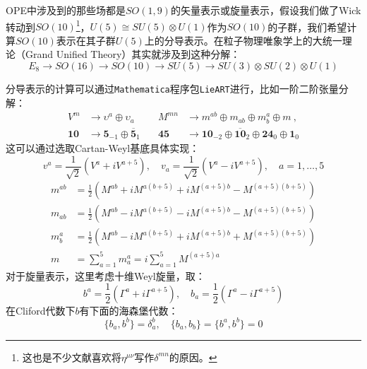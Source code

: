 OPE中涉及到的那些场都是$SO(1,9)$的矢量表示或旋量表示，假设我们做了Wick转动到$SO(10)$\footnote{这也是不少文献喜欢将$\eta^{\mu\nu}$写作$\delta^{mn}$的原因。}，$U(5)\cong SU(5)\otimes U(1)$作为$SO(10)$的子群，我们希望计算$SO(10)$表示在其子群$U(5)$上的分导表示。在粒子物理唯象学上的大统一理论（Grand Unified Theory）其实就涉及到这种分解：\cite{Georgi:2000vve,Zee:2016fuk}
\begin{equation}
	E_8\to SO(16)\to SO(10)\to SU(5)\to SU(3)\otimes SU(2)\otimes U(1)
\end{equation}

分导表示的计算可以通过\texttt{Mathematica}程序包\texttt{LieART}\cite{FEGER2020107490}进行，比如一阶二阶张量分解：
\begin{equation}
	\begin{aligned}
		V^{m}&\to\upsilon^{a}\oplus\upsilon_{a}\quad&M^{mn}&\to m^{ab}\oplus m_{ab}\oplus m_{b}^{a}\oplus m\mathrm{~,}\\
		\mathbf{10}&\to\mathbf{5}_{-1}\oplus\mathbf{\overline{5}}_{1}\quad&\mathbf{45}&\to\mathbf{10}_{-2}\oplus\mathbf{\overline{10}}_{2}\oplus\mathbf{24}_{0}\oplus\mathbf{1}_{0}
		\end{aligned}
\end{equation}
这可以通过选取Cartan-Weyl基底具体实现：\cite{Nekrasov:2005wg}
\begin{equation}
	v^a=\frac{1}{\sqrt{2}}\left(V^a+iV^{a+5}\right),\quad v_a=\frac{1}{\sqrt{2}}\left(V^a-iV^{a+5}\right),\quad a=1,\ldots,5
\end{equation}
\begin{equation}
	\begin{aligned}
		m^{ab}&=\frac{1}{2}\left(M^{ab}+iM^{a(b+5)}+iM^{(a+5)b}-M^{(a+5)(b+5)}\right)\\
		m_{ab}&=\frac{1}{2}\left(M^{ab}-iM^{a(b+5)}-iM^{(a+5)b}-M^{(a+5)(b+5)}\right)\\
		m_b^a&=\frac{1}{2}\left(M^{ab}-iM^{a(b+5)}+iM^{(a+5)b}+M^{(a+5)(b+5)}\right)\\
		m&=\sum_{a=1}^5m_a^a=i\sum_{a=1}^5M^{(a+5)a}
	\end{aligned}
\end{equation}
对于旋量表示，这里考虑十维Weyl旋量，取：
\begin{equation}
	b^a=\frac{1}{2}\left(\Gamma^a+i\Gamma^{a+5}\right),\quad b_a=\frac{1}{2}\left(\Gamma^a-i\Gamma^{a+5}\right)
\end{equation}
在Cliford代数下$b$有下面的海森堡代数：
\begin{equation}
	\{b_a,b^b\}=\delta_a^b,\quad\{b_a,b_b\}=\{b^a,b^b\}=0
\end{equation}

